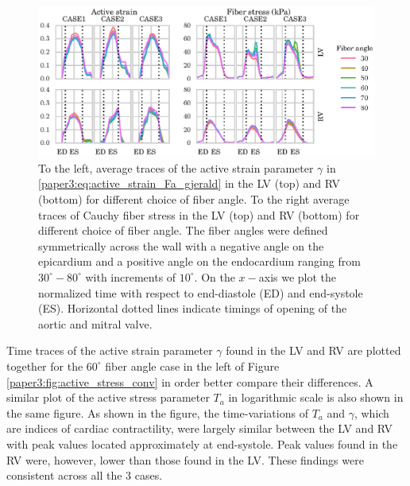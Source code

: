 \begin{figure}[htbp]
  \centering
  \includegraphics[width=\textwidth]{figures/mechanical_analysis}
  \caption{\label{paper3:fig:mechanical_analysis}To the left, average traces of the active strain
    parameter $\gamma$ in \eqref{paper3:eq:active_strain_Fa_gjerald} in the
    LV (top) and RV (bottom) for different choice of fiber angle. To
    the right average traces of Cauchy fiber stress in the  LV (top)
    and RV (bottom) for different choice of fiber angle. The
    fiber angles were defined symmetrically across the wall with a
    negative angle on the epicardium and a positive angle on the
    endocardium ranging from $30^{\circ} - 80^{\circ}$ with increments
  of $10^{\circ}$. On the $x-$axis we plot the normalized time with
  respect to end-diastole (ED) and end-systole (ES). Horizontal dotted
lines indicate timings of opening of the aortic and mitral valve.}
\end{figure}

Time traces of the active strain parameter $\gamma$ found in the LV
and RV are plotted together for the $60^\circ$ fiber angle case in the
left of Figure \ref{paper3:fig:active_stress_conv} in order better compare
their differences. A similar plot of the active stress parameter $T_a$
in logarithmic scale is also shown in the same figure. As shown in
the figure, the time-variations of $T_a$ and $\gamma$, which are
indices of cardiac contractility, were largely similar between the LV
and RV with peak values located approximately at end-systole. Peak
values found in the RV were, however, lower than those found in the
LV. These findings were consistent across all the 3 cases.

